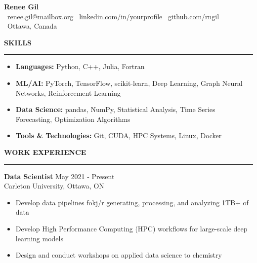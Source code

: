 \documentclass[11pt]{article}
\begin{document}
\pagestyle{empty}

\begin{center}
    \textbf{\Huge Renee Gil} \\[8pt]
    {\small
    \faEnvelope\ \href{mailto:renee.gil@mailbox.org}{renee.gil@mailbox.org} \hspace{0.2in}
    \faLinkedin\ \href{https://linkedin.com/in/yourprofile}{linkedin.com/in/yourprofile} \hspace{0.2in}
    \faGithub\ \href{https://github.com/rngil}{github.com/rngil} \\[4pt]
    \faMapMarker*\ Ottawa, Canada
    }
\end{center}

{\color{headinggray}\textbf{\large SKILLS}}\\[-10pt]
\noindent\textcolor{accentblue}{\rule{\textwidth}{1.5pt}}
\vspace*{-0.15in}

\begin{itemize}[itemsep=-2.5pt, topsep=0pt, leftmargin=*]
    \item \textbf{Languages:} Python, C++, Julia, Fortran
    \item \textbf{ML/AI:} PyTorch, TensorFlow, scikit-learn, Deep Learning, Graph Neural Networks, Reinforcement Learning
    \item \textbf{Data Science:} pandas, NumPy, Statistical Analysis, Time Series Forecasting, Optimization Algorithms
    \item \textbf{Tools \& Technologies:} Git, CUDA, HPC Systems, Linux, Docker
\end{itemize}

\vspace*{0.1in}

{\color{headinggray}\textbf{\large WORK EXPERIENCE}}\\[-10pt]
\noindent\textcolor{accentblue}{\rule{\textwidth}{1.5pt}}
\vspace*{-0.15in}

\textbf{Data Scientist} \hfill {\color{accentgray} May 2021 - Present}\\
{\color{accentgray} Carleton University, Ottawa, ON}\\[4pt]
\begin{itemize}[itemsep=0.1pt, topsep=0pt]
    \item Develop data pipelines fokj/r generating, processing, and analyzing 1TB+ of data
    \item Develop High Performance Computing (HPC) workflows for large-scale deep learning models
    \item Design and conduct workshops on applied data science to chemistry
\end{itemize}
\vspace*{0.15in}
\end{document}
